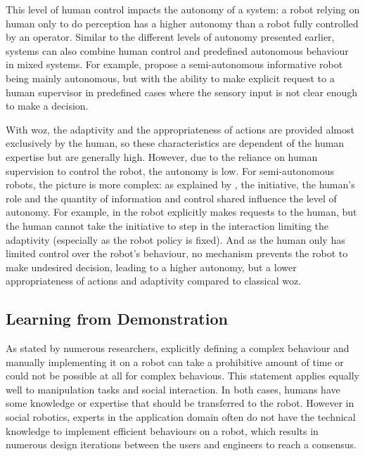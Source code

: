 	This level of human control impacts the autonomy of a system: a robot relying on human only to do perception has a higher autonomy than a robot fully controlled by an operator. Similar to the different levels of autonomy presented earlier, systems can also combine human control and predefined autonomous behaviour in mixed systems. For example, \citet{shiomi2008semi} propose a semi-autonomous informative robot being mainly autonomous, but with the ability to make explicit request to a human supervisor in predefined cases where the sensory input is not clear enough to make a decision. %
	
	With \gls{woz}, the adaptivity and the appropriateness of actions are provided almost exclusively by the human, so these characteristics are dependent of the human expertise but are generally high. However, due to the reliance on human supervision to control the robot, the autonomy is low. For semi-autonomous robots, the picture is more complex: as explained by \cite{beer2014toward}, the initiative, the human's role and the quantity of information and control shared influence the level of autonomy. For example, in \citet{shiomi2008semi} the robot explicitly makes requests to the human, but the human cannot take the initiative to step in the interaction limiting the adaptivity (especially as the robot policy is fixed). And as the human only has limited control over the robot's behaviour, no mechanism prevents the robot to make undesired decision, leading to a higher autonomy, but a lower appropriateness of actions and adaptivity compared to classical \gls{woz}.

\subsection{Learning from Demonstration} \label{ssec:back_lfd}
	As stated by numerous researchers, explicitly defining a complex behaviour and manually implementing it on a robot can take a prohibitive amount of time or could not be possible at all for complex behavious\citep{argall2009survey,billard2008robot,dautenhahn2004robots}. This statement applies equally well to manipulation tasks and social interaction. In both cases, humans have some knowledge or expertise that should be transferred to the robot. However in social robotics, experts in the application domain often do not have the technical knowledge to implement efficient behaviours on a robot, which results in numerous design iterations between the users and engineers to reach a consensus. 
	

